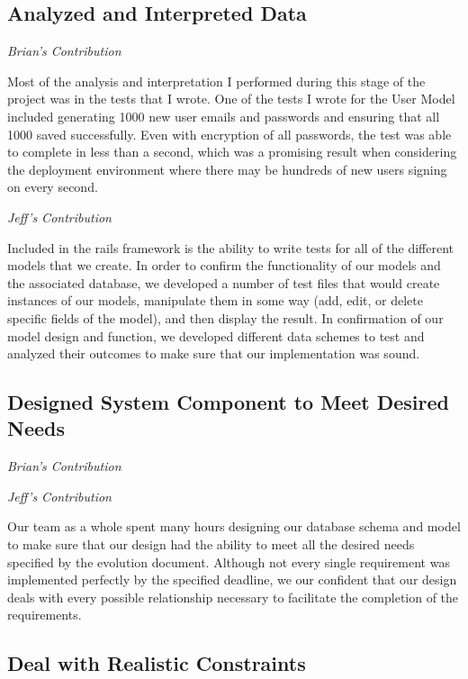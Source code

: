 \documentclass[11pt]{article}
\begin{document}
\subsection{Analyzed and Interpreted Data}

\textit{Brian's Contribution}

Most of the analysis and interpretation I performed during this stage of the project was in the tests that I wrote. One of the tests I wrote for the User Model included generating 1000 new user emails and passwords and ensuring that all 1000 saved successfully. Even with encryption of all passwords, the test was able to complete in less than a second, which was a promising result when considering the deployment environment where there may be hundreds of new users signing on every second. 

\textit{Jeff's Contribution}

Included in the rails framework is the ability to write tests for all of the different models that we create.  In order to confirm the functionality of our models and the associated database, we developed a number of test files that would create instances of our models, manipulate them in some way (add, edit, or delete specific fields of the model), and then display the result.  In confirmation of our model design and function, we developed different data schemes to test and analyzed their outcomes to make sure that our implementation was sound.

\subsection{Designed System Component to Meet Desired Needs}

\textit{Brian's Contribution}



\textit{Jeff's Contribution}

Our team as a whole spent many hours designing our database schema and model to make sure that our design had the ability to meet all the desired needs specified by the evolution document.  Although not every single requirement was implemented perfectly by the specified deadline, we our confident that our design deals with every possible relationship necessary to facilitate the completion of the requirements.

\subsection{Deal with Realistic Constraints}
\end{document}
